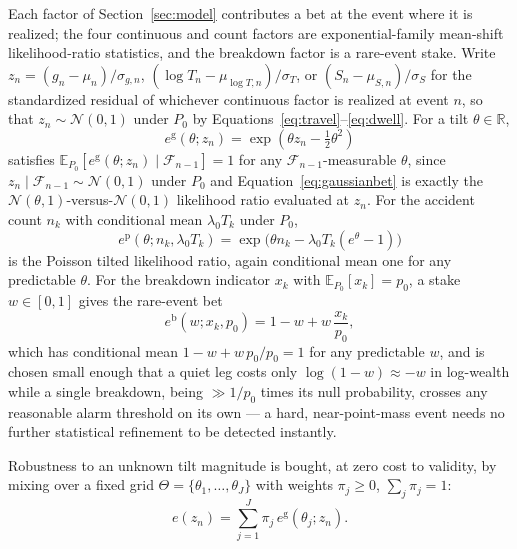 \documentclass[trsc,dblanonrev]{informs4}
\newcommand{\E}{\mathbb{E}}
\newcommand{\N}{\mathcal{N}}
\newcommand{\F}{\mathcal{F}}
\begin{document}
Each factor of Section~\ref{sec:model} contributes a bet at the event
where it is realized; the four continuous and count factors are
exponential-family mean-shift likelihood-ratio statistics, and the
breakdown factor is a rare-event stake. Write $z_n = (g_n - \mu_n)/
\sigma_{g,n}$, $(\log T_n - \mu_{\log T,n})/\sigma_T$, or
$(S_n - \mu_{S,n})/\sigma_S$ for the standardized residual of whichever
continuous factor is realized at event $n$, so that $z_n \sim \N(0,1)$
under $P_0$ by Equations~\eqref{eq:travel}--\eqref{eq:dwell}. For a
tilt $\theta \in \mathbb{R}$,
\begin{equation}\label{eq:gaussianbet}
e^{\mathrm{g}}(\theta; z_n) = \exp\!\left(\theta z_n - \tfrac{1}{2}\theta^2\right)
\end{equation}
satisfies $\E_{P_0}[e^{\mathrm{g}}(\theta; z_n) \mid \F_{n-1}] = 1$ for
any $\F_{n-1}$-measurable $\theta$, since $z_n \mid \F_{n-1} \sim
\N(0,1)$ under $P_0$ and Equation~\eqref{eq:gaussianbet} is exactly the
$\N(\theta,1)$-versus-$\N(0,1)$ likelihood ratio evaluated at $z_n$.
For the accident count $n_k$ with conditional mean $\lambda_0 T_k$
under $P_0$,
\begin{equation}\label{eq:poissonbet}
e^{\mathrm{p}}(\theta; n_k, \lambda_0 T_k) = \exp\!\bigl(\theta n_k -
\lambda_0 T_k (e^\theta - 1)\bigr)
\end{equation}
is the Poisson tilted likelihood ratio, again conditional mean one for
any predictable $\theta$. For the breakdown indicator $x_k$ with
$\E_{P_0}[x_k] = p_0$, a stake $w \in [0,1]$ gives the rare-event bet
\begin{equation}\label{eq:bernoullibet}
e^{\mathrm{b}}(w; x_k, p_0) = 1 - w + w\,\frac{x_k}{p_0},
\end{equation}
which has conditional mean $1 - w + w\,p_0/p_0 = 1$ for any
predictable $w$, and is chosen small enough that a quiet leg costs only
$\log(1-w) \approx -w$ in log-wealth while a single breakdown, being
$\gg 1/p_0$ times its null probability, crosses any reasonable alarm
threshold on its own --- a hard, near-point-mass event needs no further
statistical refinement to be detected instantly.

Robustness to an unknown tilt magnitude is bought, at zero cost to
validity, by mixing over a fixed grid $\Theta = \{\theta_1, \dots,
\theta_J\}$ with weights $\pi_j \ge 0$, $\sum_j \pi_j = 1$:
\begin{equation}\label{eq:mixture}
e(z_n) = \sum_{j=1}^J \pi_j\, e^{\mathrm{g}}(\theta_j; z_n).
\end{equation}
\end{document}
